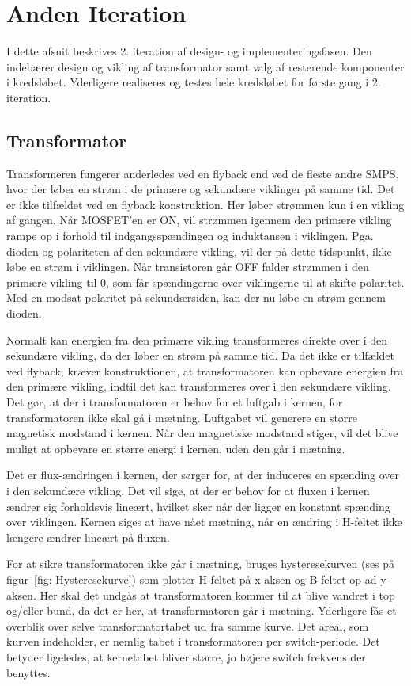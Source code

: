 \chapter{Anden Iteration}
I dette afsnit beskrives 2. iteration af design- og implementeringsfasen. Den indebærer design og vikling af transformator samt valg af resterende komponenter i kredsløbet. Yderligere realiseres og testes hele kredsløbet for første gang i 2. iteration.

\section{Transformator}
Transformeren fungerer anderledes ved en flyback end ved de fleste andre SMPS, hvor der løber en strøm i de primære og sekundære viklinger på samme tid. Det er ikke tilfældet ved en flyback konstruktion. Her løber strømmen kun i en vikling af gangen. Når MOSFET’en er ON, vil strømmen igennem den primære vikling rampe op i forhold til indgangsspændingen og induktansen i viklingen. Pga. dioden og polariteten af den sekundære vikling, vil der på dette tidspunkt, ikke løbe en strøm i viklingen. Når transistoren går OFF falder strømmen i den primære vikling til 0, som får spændingerne over viklingerne til at skifte polaritet. Med en modsat polaritet på sekundærsiden, kan der nu løbe en strøm gennem dioden. 


Normalt kan energien fra den primære vikling transformeres direkte over i den sekundære vikling, da der løber en strøm på samme tid. Da det ikke er tilfældet ved flyback, kræver konstruktionen, at transformatoren kan opbevare energien fra den primære vikling, indtil det kan transformeres over i den sekundære vikling. Det gør, at der i transformatoren er behov for et luftgab i kernen, for transformatoren ikke skal gå i mætning. Luftgabet vil generere en større magnetisk modstand i kernen. Når den magnetiske modstand stiger, vil det blive muligt at opbevare en større energi i kernen, uden den går i mætning. 


Det er flux-ændringen i kernen, der sørger for, at der induceres en spænding over i den sekundære vikling. Det vil sige, at der er behov for at fluxen i kernen ændrer sig forholdsvis lineært, hvilket sker når der ligger en konstant spænding over viklingen. Kernen siges at have nået mætning, når en ændring i H-feltet ikke længere ændrer lineært på fluxen. 


For at sikre transformatoren ikke går i mætning, bruges hysteresekurven (ses på figur~\ref{fig: Hysteresekurve}) som plotter H-feltet på x-aksen og B-feltet op ad y-aksen. Her skal det undgås at transformatoren kommer til at blive vandret i top og/eller bund, da det er her, at transformatoren går i mætning. Yderligere fås et overblik over selve transformatortabet ud fra samme kurve. Det areal, som kurven indeholder, er nemlig tabet i transformatoren per switch-periode. Det betyder ligeledes, at kernetabet bliver større, jo højere switch frekvens der benyttes. 

